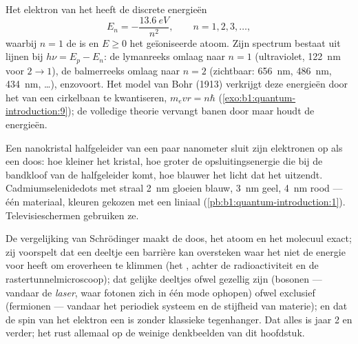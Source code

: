 \begin{proposition}\label{prop:b1:quantum-introduction:hydrogen}
Het elektron van het  heeft de discrete energieën
\[
E_n = -\frac{\qty{13.6}{eV}}{n^2} , \qquad n = 1, 2, 3, \ldots ,
\]
waarbij $n = 1$ de  is en $E \geq 0$ het geïoniseerde atoom. Zijn
spectrum bestaat uit lijnen bij $h\nu = E_p - E_n$: de lymanreeks omlaag
naar $n = 1$ (ultraviolet, \qty{122}{nm} voor $2 \to 1$), de balmerreeks
omlaag naar $n = 2$ (zichtbaar: \qty{656}{nm}, \qty{486}{nm}, \qty{434}{nm}, \ldots),
enzovoort. Het model van Bohr (1913) verkrijgt deze energieën door het
 van een cirkelbaan te kwantiseren, $m_evr = n\hbar$
(\cref{exo:b1:quantum-introduction:9}); de volledige theorie vervangt banen door
 maar houdt de energieën.
\end{proposition}
\admitted

\begin{example}\label{ex:b1:quantum-introduction:dot}
Een nanokristal halfgeleider van een paar nanometer sluit zijn
elektronen op als een doos: hoe kleiner het kristal, hoe groter de
opsluitingsenergie die bij de bandkloof van de halfgeleider komt, hoe blauwer het
licht dat het uitzendt. Cadmiumselenidedots met straal \qty{2}{nm} gloeien blauw,
\qty{3}{nm} geel, \qty{4}{nm} rood --- één materiaal, kleuren gekozen met
een liniaal (\cref{pb:b1:quantum-introduction:1}). Televisieschermen gebruiken ze.
\end{example}

\begin{remark}\label{rem:b1:quantum-introduction:rest}
De vergelijking van Schrödinger maakt de doos, het atoom en het molecuul
exact; zij voorspelt dat een deeltje een barrière kan oversteken waar het niet de
energie voor heeft om eroverheen te klimmen (het \emph{}, achter de radioactiviteit en de
rastertunnelmicroscoop); dat gelijke deeltjes ofwel gezellig zijn
(bosonen --- vandaar de \emph{laser}, waar fotonen zich in één
mode ophopen) ofwel exclusief (fermionen --- vandaar het periodiek systeem en de
stijfheid van materie); en dat de spin van het elektron een  is zonder klassieke tegenhanger. Dat alles is jaar 2 en verder;
het rust allemaal op de weinige denkbeelden van dit hoofdstuk.
\end{remark}

